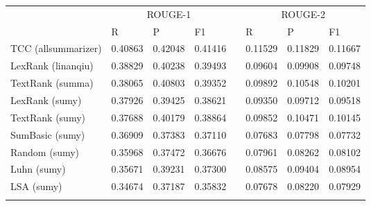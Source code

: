 \begin{tabular}{llllllll}

\noalign{\smallskip}\hline\noalign{\smallskip}

\multirow{2}{*}{Peer} & \multicolumn{3}{c}{ROUGE-1}  &&  \multicolumn{3}{c}{ROUGE-2}  \\
\cline{2-4} \cline{6-8} \noalign{\smallskip}
& R & P & F1 && R & P & F1 \\

\noalign{\smallskip}\hline\noalign{\smallskip}

TCC (allsummarizer) & 0.40863 & 0.42048 & 0.41416 && 0.11529 & 0.11829 & 0.11667 \\
LexRank (linanqiu) & 0.38829 & 0.40238 & 0.39493 && 0.09604 & 0.09908 & 0.09748 \\
TextRank (summa) & 0.38065 & 0.40803 & 0.39352 && 0.09892 & 0.10548 & 0.10201 \\
LexRank (sumy) & 0.37926 & 0.39425 & 0.38621 && 0.09350 & 0.09712 & 0.09518 \\
TextRank (sumy) & 0.37688 & 0.40179 & 0.38864 && 0.09852 & 0.10471 & 0.10145 \\
SumBasic (sumy) & 0.36909 & 0.37383 & 0.37110 && 0.07683 & 0.07798 & 0.07732 \\
Random (sumy) & 0.35968 & 0.37472 & 0.36676 && 0.07961 & 0.08262 & 0.08102 \\
Luhn (sumy) & 0.35671 & 0.39231 & 0.37300 && 0.08575 & 0.09404 & 0.08954 \\
LSA (sumy) & 0.34674 & 0.37187 & 0.35832 && 0.07678 & 0.08220 & 0.07929 \\
\noalign{\smallskip}\hline
\end{tabular} 
